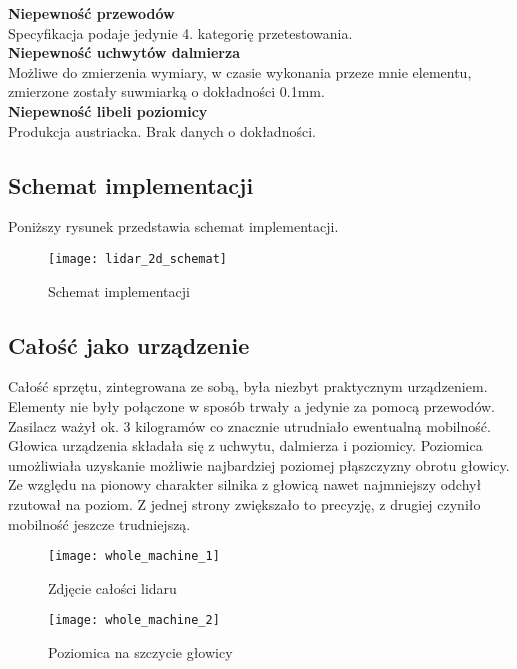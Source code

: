 \textbf{Niepewność przewodów}\\
Specyfikacja podaje jedynie 4. kategorię przetestowania.\\

\textbf{Niepewność uchwytów dalmierza}\\
Możliwe do zmierzenia wymiary, w czasie wykonania przeze mnie elementu, zmierzone zostały suwmiarką o dokładności 0.1mm.\\

\textbf{Niepewność libeli poziomicy}\\
Produkcja austriacka. Brak danych o dokładności.

\newpage
\subsection {Schemat implementacji}
Poniższy rysunek przedstawia schemat implementacji.

\begin{figure}[h]
    \centering
    \texttt{[image: lidar\_2d\_schemat]}
    \caption{Schemat implementacji}
    \label{fig:lidar_2d_schemat}
\end{figure}

\subsection {Całość jako urządzenie}
Całość sprzętu, zintegrowana ze sobą, była niezbyt praktycznym urządzeniem. Elementy nie były połączone w sposób trwały a jedynie za pomocą przewodów. Zasilacz ważył ok. 3 kilogramów co znacznie utrudniało ewentualną mobilność.\\

Głowica urządzenia składała się z uchwytu, dalmierza i poziomicy. Poziomica umożliwiała uzyskanie możliwie najbardziej poziomej płąszczyzny obrotu głowicy. Ze względu na pionowy charakter silnika z głowicą nawet najmniejszy odchył rzutował na poziom. Z jednej strony zwiększało to precyzję, z drugiej czyniło mobilność jeszcze trudniejszą.\\

\begin{figure}[h]
    \centering
    \texttt{[image: whole\_machine\_1]}
    \caption{Zdjęcie całości lidaru}
    \label{fig:whole_machine_1}
\end{figure}

\begin{figure}[h]
    \centering
    \texttt{[image: whole\_machine\_2]}
    \caption{Poziomica na szczycie głowicy}
    \label{fig:whole_machine_2}
\end{figure}
